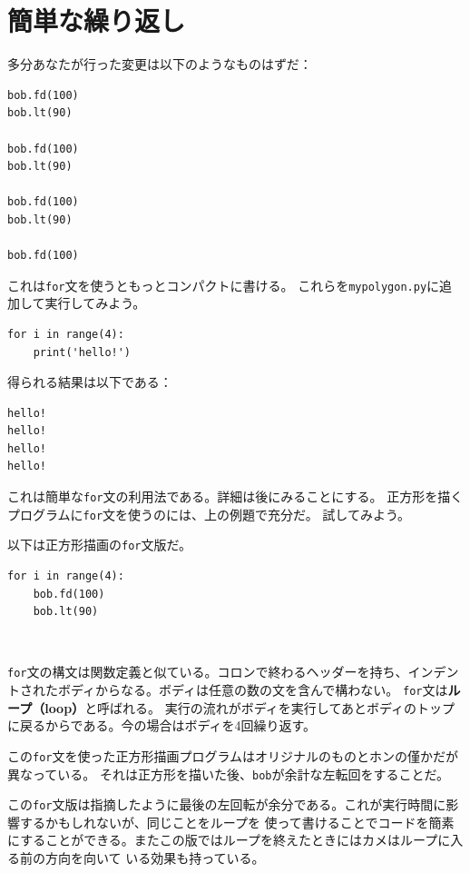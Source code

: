 \documentclass[a4j,12pt,makeidx]{jbook}
\begin{document}
\section{簡単な繰り返し}
多分あなたが行った変更は以下のようなものはずだ：
\begin{verbatim}
bob.fd(100)
bob.lt(90)

bob.fd(100)
bob.lt(90)

bob.fd(100)
bob.lt(90)

bob.fd(100)
\end{verbatim} \par
これは{\tt for}文を使うともっとコンパクトに書ける。
これらを{\tt mypolygon.py}に追加して実行してみよう。
\begin{verbatim}
for i in range(4):
    print('hello!')
\end{verbatim}
得られる結果は以下である：
\begin{verbatim}
hello!
hello!
hello!
hello!
\end{verbatim}
これは簡単な{\tt for}文の利用法である。詳細は後にみることにする。
正方形を描くプログラムに{\tt for}文を使うのには、上の例題で充分だ。 試してみよう。\par
以下は正方形描画の{\tt for}文版だ。
\begin{verbatim}
for i in range(4):
    bob.fd(100)
    bob.lt(90)
\end{verbatim}　\par
{\tt for}文の構文は関数定義と似ている。コロンで終わるヘッダーを持ち、インデントされたボディからなる。ボディは任意の数の文を含んで構わない。
{\tt for}文は{\bf ループ（loop）}と呼ばれる。
実行の流れがボディを実行してあとボディのトップに戻るからである。今の場合はボディを4回繰り返す。\par
この{\tt for}文を使った正方形描画プログラムはオリジナルのものとホンの僅かだが異なっている。
それは正方形を描いた後、{\tt bob}が余計な左転回をすることだ。\par
この{\tt for}文版は指摘したように最後の左回転が余分である。これが実行時間に影響するかもしれないが、同じことをループを
使って書けることでコードを簡素にすることができる。またこの版ではループを終えたときにはカメはループに入る前の方向を向いて
いる効果も持っている。
%
\end{document}
